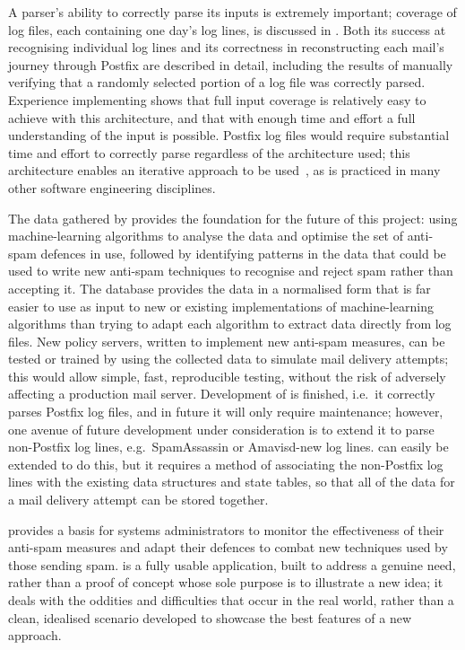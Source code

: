 A parser's ability to correctly parse its inputs is extremely important;
\parsernames{} coverage of \numberOFlogFILES{} log files, each containing
one day's log lines, is discussed in .  Both
its success at recognising individual log lines  and its correctness in
reconstructing each mail's journey through Postfix are described in detail,
including the results of manually verifying that a randomly selected
portion of a log file was correctly parsed.  Experience implementing
\parsername{} shows that full input coverage is relatively easy to achieve
with this architecture, and that with enough time and effort a full
understanding of the input is possible.  Postfix log files would require
substantial time and effort to correctly parse regardless of the
architecture used; this architecture enables an iterative approach to be
used~\cite{stepwise-refinement}, as is practiced in many other software
engineering disciplines.

The data gathered by \parsername{} provides the foundation for the future
of this project: using machine-learning algorithms to analyse the data and
optimise the set of anti-spam defences in use, followed by identifying
patterns in the data that could be used to write new anti-spam techniques
to recognise and reject spam rather than accepting it.  The database
provides the data in a normalised form that is far easier to use as input
to new or existing implementations of machine-learning algorithms than
trying to adapt each algorithm to extract data directly from log files.
New policy servers, written to implement new anti-spam measures, can be
tested or trained by using the collected data to simulate mail delivery
attempts; this would allow simple, fast, reproducible testing, without the
risk of adversely affecting a production mail server.  Development of
\parsername{} is finished, i.e.\ it correctly parses Postfix log files, and
in future it will only require maintenance; however, one avenue of future
development under consideration is to extend it to parse non-Postfix log
lines, e.g.\ SpamAssassin or Amavisd-new log lines.  \parsername{} can
easily be extended to do this, but it requires a method of associating the
non-Postfix log lines with the existing data structures and state tables,
so that all of the data for a mail delivery attempt can be stored together.

\parsername{} provides a basis for systems administrators to monitor the
effectiveness of their anti-spam measures and adapt their defences to
combat new techniques used by those sending spam.  \parsername{} is a fully
usable application, built to address a genuine need, rather than a proof of
concept whose sole purpose is to illustrate a new idea; it deals with the
oddities and difficulties that occur in the real world, rather than a
clean, idealised scenario developed to showcase the best features of a new
approach.

